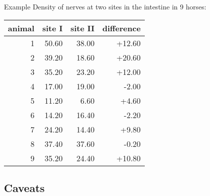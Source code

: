 \begin{frame}{Example}
    Density of nerves at two sites in the intestine in 9 horses:
    \begin{center}
\begin{tabular}{rrrr}
  \hline
 animal & site I & site II & difference \\ 
  \hline
  1 &  50.60 & 38.00 & +12.60 \\ 
  2 &  39.20 & 18.60 & +20.60 \\ 
  3 &  35.20 & 23.20 & +12.00 \\ 
  4 &  17.00 & 19.00 & -2.00 \\ 
  5 &  11.20 & 6.60 & +4.60 \\ 
  6 &  14.20 & 16.40 & -2.20 \\ 
  7 &  24.20 & 14.40 & +9.80 \\ 
  8 &  37.40 & 37.60 & -0.20 \\ 
  9 &  35.20 & 24.40 & +10.80 \\ 
   \hline
\end{tabular}
    \end{center}

\end{frame}

\subsection{Caveats}


